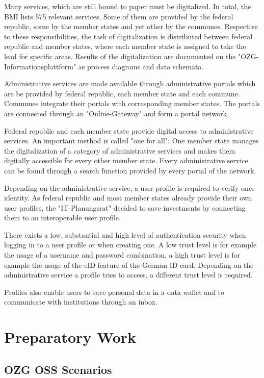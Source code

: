 \documentclass[
     12pt,         %
     a4paper,      %
     BCOR=10mm,version=first,     %
     DIV=14,version=first,        %
     ]{scrreprt}
\begin{document}
Many services, which are still bound to paper must be digitalized. In total, the BMI lists 575 relevant services. Some of them are provided by the federal republic, some by the member states and yet other by the communes. Respective to these responsibilities, the task of digitalization is distributed between federal republic and member states, where each member state is assigned to take the lead for specific areas. \cite{BMI:Onlinezugangsgesetz} Results of the digitalization are documented on the "OZG-Informationsplattform" \cite{BMI:Informatiosplattform} as process diagrams and data schemata.

Administrative services are made available through administrative portals which are be provided by federal republic, each member state and each commune. Communes integrate their portals with corresponding member states. The portals are connected through an "Online-Gateway" and form a portal network.

Federal republic and each member state provide digital access to administrative services. An important method is called "one for all": One member state manages the digitalization of a category of administrative services and makes them digitally accessible for every other member state. Every administrative service can be found through a search function provided by every portal of the network.

Depending on the administrative service, a user profile is required to verify ones identity. As federal republic and most member states already provide their own user profiles, the "IT-Planungsrat" decided to save investments by connecting them to an interoperable user profile.

There exists a low, substantial and high level of authentication security when logging in to a user profile or when creating one.
A low trust level is for example the usage of a username and password combination, a high trust level is for example the usage of the eID feature of the German ID card. Depending on the administrative service a profile tries to access, a different trust level is required.

Profiles also enable users to save personal data in a data wallet and to communicate with institutions through an inbox.

\chapter{Preparatory Work}

\section{OZG OSS Scenarios}
\end{document}
